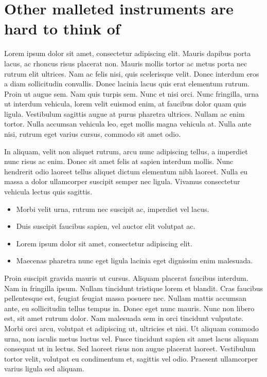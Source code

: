 \documentclass{article}
\begin{document}
\section{Other malleted instruments are hard to think of}\hypertarget{other-malleted-instruments-are-hard-to-think-of}{}\label{other-malleted-instruments-are-hard-to-think-of}

Lorem ipsum dolor sit amet, consectetur adipiscing elit. Mauris dapibus porta lacus, ac rhoncus risus placerat non. Mauris mollis tortor ac metus porta nec rutrum elit ultrices. Nam ac felis nisi, quis scelerisque velit. Donec interdum eros a diam sollicitudin convallis. Donec lacinia lacus quis erat elementum rutrum. Proin ut augue sem. Nam quis turpis sem. Nunc et nisi orci. Nunc fringilla, urna ut interdum vehicula, lorem velit euismod enim, at faucibus dolor quam quis ligula. Vestibulum sagittis augue at purus pharetra ultrices. Nullam ac enim tortor. Nulla accumsan vehicula leo, eget mollis magna vehicula at. Nulla ante nisi, rutrum eget varius cursus, commodo sit amet odio.

In aliquam, velit non aliquet rutrum, arcu nunc adipiscing tellus, a imperdiet nunc risus ac enim. Donec sit amet felis at sapien interdum mollis. Nunc hendrerit odio laoreet tellus aliquet dictum elementum nibh laoreet. Nulla eu massa a dolor ullamcorper suscipit semper nec ligula. Vivamus consectetur vehicula lectus quis sagittis.

\begin{itemize}
\item Morbi velit urna, rutrum nec suscipit ac, imperdiet vel lacus.
\item Duis suscipit faucibus sapien, vel auctor elit volutpat ac.
\item Lorem ipsum dolor sit amet, consectetur adipiscing elit.
\item Maecenas pharetra nunc eget ligula lacinia eget dignissim enim malesuada.
\end{itemize}

Proin suscipit gravida mauris ut cursus. Aliquam placerat faucibus interdum. Nam in fringilla ipsum. Nullam tincidunt tristique lorem et blandit. Cras faucibus pellentesque est, feugiat feugiat massa posuere nec. Nullam mattis accumsan ante, eu sollicitudin tellus tempus in. Donec eget nunc mauris. Nunc non libero est, sit amet rutrum dolor. Nam malesuada sem in orci tincidunt vulputate. Morbi orci arcu, volutpat et adipiscing ut, ultricies et nisi. Ut aliquam commodo urna, non iaculis metus luctus vel. Fusce tincidunt sapien sit amet lacus aliquam consequat ut in lectus. Sed laoreet risus non augue placerat laoreet. Vestibulum tortor velit, volutpat eu condimentum et, sagittis vel odio. Praesent ullamcorper varius ligula sed aliquam.
\end{document}
